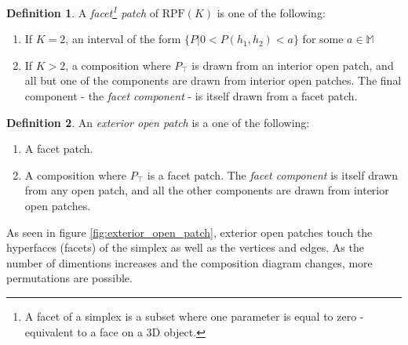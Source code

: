 \documentclass[twoside]{article}
\theoremstyle{plain}%
\theoremstyle{definition}
\newtheorem{definition}{Definition}[section]
\theoremstyle{remark}
\begin{document}
\begin{definition}
A \textit{facet\footnote{A facet of a simplex is a subset where one parameter is equal to zero - equivalent to a face on a 3D object.} patch} of \(\text{RPF}(K)\) is one of the following:

\begin{enumerate}
  \item If \(K = 2\), an interval of the form \(\{P | 0 < P(h_1, h_2) < a\}\) for some \(a \in \mathbb{M}\) 
  \item If \(K > 2\), a composition where \(P_{\top}\) is drawn from an interior open patch, and all but one of the components are drawn from interior open patches. The final component - the \textit{facet component} - is itself drawn from a facet patch.
\end{enumerate}
\end{definition}

\begin{definition}
An \textit{exterior open patch} is a one of the following:

\begin{enumerate}
  \item A facet patch.
  \item A composition where \(P_{\top}\) is a facet patch. The \textit{facet component} is itself drawn from any open patch, and all the other components are drawn from interior open patches.
\end{enumerate}
\end{definition}

As seen in figure \ref{fig:exterior_open_patch}, exterior open patches touch the hyperfaces (facets) of the simplex as well as the vertices and edges.  As the number of dimentions increases and the composition diagram changes, more permutations are possible.
\end{document}
